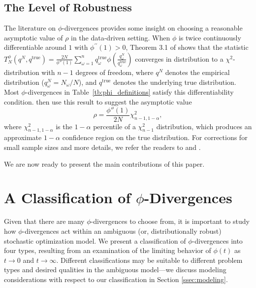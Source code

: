 \documentclass[opre,nonblindrev]{informs3} %
\newcommand{\qtrue}{q^{\text{true}}}
\begin{document}
\subsection{The Level of Robustness}
\label{ssec:robust_level}

The literature on $\phi$-divergences provides some insight on choosing a reasonable asymptotic value of $\rho$ in the data-driven setting. 
When $\phi$ is twice continuously differentiable around $1$ with $\phi^{\prime \prime}(1)>0$, Theorem 3.1 of \cite{pardo2005statistical} shows that the statistic $T^\phi_N(q^N,\qtrue) = \frac{2N}{\phi''(1)} \sum_{\omega=1}^n \qtrue_\omega \phi\left(\frac{q^N_\omega}{\qtrue_\omega}\right)$ converges in distribution to a $\chi^2$-distribution with $n-1$ degrees of freedom, where $q^N$ denotes the empirical distribution ($q^N_\omega = N_\omega/N$), and $\qtrue$ denotes the underlying true distribution.
Most $\phi$-divergences in Table~\ref{tb:phi_definitions} satisfy this differentiability condition.
\cite{bental2011robust} then use this result to suggest the asymptotic value
\begin{equation} \label{eq:asymptotic_rho}
	\rho = \frac{\phi''(1)}{2N} \chi^2_{n-1,1-\alpha},
\end{equation}
where $\chi^2_{n-1,1-\alpha}$ is the $1-\alpha$ percentile of a $\chi^2_{n-1}$ distribution, which produces an approximate $1-\alpha$ confidence region on the true distribution.
For corrections for small sample sizes and more details, we refer the readers to \citep{pardo2005statistical} and \citep{bental2011robust}. 

We are now ready to present the main contributions of this paper.

\section{A Classification of $\phi$-Divergences}
\label{sec:classification}

Given that there are many $\phi$-divergences to choose from, it is important to study how $\phi$-divergences act within an ambiguous (or, distributionally robust) stochastic optimization model. 
We present a classification of $\phi$-divergences into four types, resulting from an examination of the limiting behavior of $\phi(t)$ as $t \rightarrow 0$ and $t \rightarrow \infty$.
Different classifications may be suitable to different problem types and desired qualities in the ambiguous model---we discuss modeling considerations with respect to our classification in Section \ref{ssec:modeling}.
\end{document}
